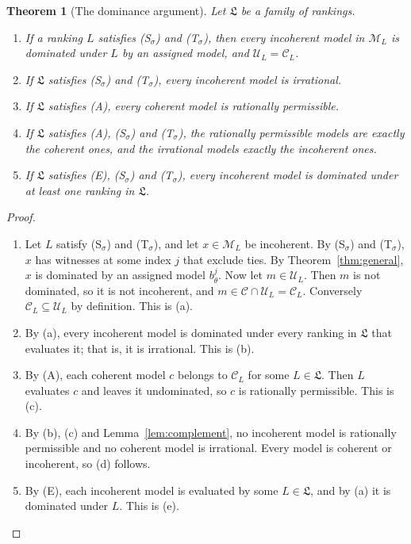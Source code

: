 \documentclass[11pt]{article}
\newtheorem{theorem}{Theorem}[section]
\theoremstyle{definition}
\theoremstyle{remark}
\newcommand{\M}{\mathcal M}
\newcommand{\C}{\mathcal C}
\newcommand{\U}{\mathcal U}
\newcommand{\Lf}{\mathfrak L}
\begin{document}
\begin{theorem}[The dominance argument]\label{thm:argument}
Let $\Lf$ be a family of rankings.
\begin{enumerate}[label=(\alph*)]
\item If a ranking $L$ satisfies (S$_\sigma$) and (T$_\sigma$), then every incoherent model in $\M_L$ is dominated under $L$ by an assigned model, and $\U_L=\C_L$.
\item If $\Lf$ satisfies (S$_\sigma$) and (T$_\sigma$), every incoherent model is irrational.
\item If $\Lf$ satisfies (A), every coherent model is rationally permissible.
\item If $\Lf$ satisfies (A), (S$_\sigma$) and (T$_\sigma$), the rationally permissible models are exactly the coherent ones, and the irrational models exactly the incoherent ones.
\item If $\Lf$ satisfies (E), (S$_\sigma$) and (T$_\sigma$), every incoherent model is dominated under at least one ranking in $\Lf$.
\end{enumerate}
\end{theorem}
\begin{proof}
\leavevmode
\begin{enumerate}[label=\arabic*.,leftmargin=*]
\item Let $L$ satisfy (S$_\sigma$) and (T$_\sigma$), and let $x\in\M_L$ be incoherent. By (S$_\sigma$) and (T$_\sigma$), $x$ has witnesses at some index $j$ that exclude ties. By Theorem~\ref{thm:general}, $x$ is dominated by an assigned model $b^j_\theta$. Now let $m\in\U_L$. Then $m$ is not dominated, so it is not incoherent, and $m\in\C\cap\U_L=\C_L$. Conversely $\C_L\subseteq\U_L$ by definition. This is (a).
\item By (a), every incoherent model is dominated under every ranking in $\Lf$ that evaluates it; that is, it is irrational. This is (b).
\item By (A), each coherent model $c$ belongs to $\C_L$ for some $L\in\Lf$. Then $L$ evaluates $c$ and leaves it undominated, so $c$ is rationally permissible. This is (c).
\item By (b), (c) and Lemma~\ref{lem:complement}, no incoherent model is rationally permissible and no coherent model is irrational. Every model is coherent or incoherent, so (d) follows.
\item By (E), each incoherent model is evaluated by some $L\in\Lf$, and by (a) it is dominated under $L$. This is (e).\qedhere
\end{enumerate}
\end{proof}
\end{document}
